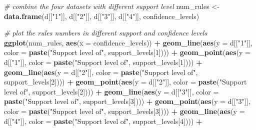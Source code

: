 \documentclass[]{article}
\newenvironment{Shaded}{\begin{snugshade}}{\end{snugshade}}
\newcommand{\CommentTok}[1]{\textcolor[rgb]{0.56,0.35,0.01}{\textit{#1}}}
\newcommand{\DataTypeTok}[1]{\textcolor[rgb]{0.13,0.29,0.53}{#1}}
\newcommand{\DecValTok}[1]{\textcolor[rgb]{0.00,0.00,0.81}{#1}}
\newcommand{\KeywordTok}[1]{\textcolor[rgb]{0.13,0.29,0.53}{\textbf{#1}}}
\newcommand{\NormalTok}[1]{#1}
\newcommand{\OperatorTok}[1]{\textcolor[rgb]{0.81,0.36,0.00}{\textbf{#1}}}
\newcommand{\StringTok}[1]{\textcolor[rgb]{0.31,0.60,0.02}{#1}}
\begin{document}
\begin{Shaded}
\begin{Highlighting}[]
\CommentTok{# combine the four datasets with different support level}
\NormalTok{num_rules <-}\StringTok{ }\KeywordTok{data.frame}\NormalTok{(d[[}\StringTok{"1"}\NormalTok{]], d[[}\StringTok{"2"}\NormalTok{]], d[[}\StringTok{"3"}\NormalTok{]], d[[}\StringTok{"4"}\NormalTok{]], confidence_levels)}

\CommentTok{# plot the rules numbers in different support and confidence levels}
\KeywordTok{ggplot}\NormalTok{(num_rules, }\KeywordTok{aes}\NormalTok{(}\DataTypeTok{x =}\NormalTok{ confidence_levels)) }\OperatorTok{+}
\StringTok{    }
\StringTok{  }\KeywordTok{geom_line}\NormalTok{(}\KeywordTok{aes}\NormalTok{(}\DataTypeTok{y =}\NormalTok{ d[[}\StringTok{"1"}\NormalTok{]], }\DataTypeTok{color =} \KeywordTok{paste}\NormalTok{(}\StringTok{"Support level of"}\NormalTok{, support_levels[}\DecValTok{1}\NormalTok{]))) }\OperatorTok{+}
\StringTok{  }\KeywordTok{geom_point}\NormalTok{(}\KeywordTok{aes}\NormalTok{(}\DataTypeTok{y =}\NormalTok{ d[[}\StringTok{"1"}\NormalTok{]], }\DataTypeTok{color =} \KeywordTok{paste}\NormalTok{(}\StringTok{"Support level of"}\NormalTok{, support_levels[}\DecValTok{1}\NormalTok{]))) }\OperatorTok{+}
\StringTok{  }
\StringTok{  }\KeywordTok{geom_line}\NormalTok{(}\KeywordTok{aes}\NormalTok{(}\DataTypeTok{y =}\NormalTok{ d[[}\StringTok{"2"}\NormalTok{]], }\DataTypeTok{color =} \KeywordTok{paste}\NormalTok{(}\StringTok{"Support level of"}\NormalTok{, support_levels[}\DecValTok{2}\NormalTok{]))) }\OperatorTok{+}
\StringTok{  }\KeywordTok{geom_point}\NormalTok{(}\KeywordTok{aes}\NormalTok{(}\DataTypeTok{y =}\NormalTok{ d[[}\StringTok{"2"}\NormalTok{]], }\DataTypeTok{color =} \KeywordTok{paste}\NormalTok{(}\StringTok{"Support level of"}\NormalTok{, support_levels[}\DecValTok{2}\NormalTok{]))) }\OperatorTok{+}
\StringTok{  }
\StringTok{  }\KeywordTok{geom_line}\NormalTok{(}\KeywordTok{aes}\NormalTok{(}\DataTypeTok{y =}\NormalTok{ d[[}\StringTok{"3"}\NormalTok{]], }\DataTypeTok{color =} \KeywordTok{paste}\NormalTok{(}\StringTok{"Support level of"}\NormalTok{, support_levels[}\DecValTok{3}\NormalTok{]))) }\OperatorTok{+}
\StringTok{  }\KeywordTok{geom_point}\NormalTok{(}\KeywordTok{aes}\NormalTok{(}\DataTypeTok{y =}\NormalTok{ d[[}\StringTok{"3"}\NormalTok{]], }\DataTypeTok{color =} \KeywordTok{paste}\NormalTok{(}\StringTok{"Support level of"}\NormalTok{, support_levels[}\DecValTok{3}\NormalTok{]))) }\OperatorTok{+}
\StringTok{  }
\StringTok{  }\KeywordTok{geom_line}\NormalTok{(}\KeywordTok{aes}\NormalTok{(}\DataTypeTok{y =}\NormalTok{ d[[}\StringTok{"4"}\NormalTok{]], }\DataTypeTok{color =} \KeywordTok{paste}\NormalTok{(}\StringTok{"Support level of"}\NormalTok{, support_levels[}\DecValTok{4}\NormalTok{]))) }\OperatorTok{+}

\end{Highlighting}
\end{Shaded}
\end{document}

